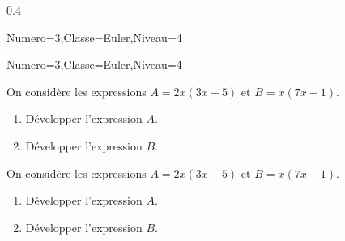 \documentclass[12pt,french]{article}
\newenvironment{Description}
               {\list{}{\labelwidth0pt \leftmargin0pt \itemindent-\leftmargin
                        \let\makelabel\Descriptionlabel}}
               {\endlist}
\newcommand*\Descriptionlabel[1]{\hspace\labelsep
                                \normalfont\bfseries #1}
\begin{document}
\begin{Description}
\begin{Codes}{0.4}{}
\begin{Maquette}[DS]{Numero=3,Classe=Euler,Niveau=4}
\begin{exercice}[BaremeDetaille]
  \end{exercice}
\end{Maquette}
\end{Codes}
\begin{Maquette}[DS]{Numero=3,Classe=Euler,Niveau=4}
  \begin{exercice}  %
    On considère les expressions $A=2x(3x+5)$ et $B=x(7x-1)$.
    \begin{enumerate}
    \item{} Développer l'expression $A$.
    \item{} Développer l'expression $B$.
    \end{enumerate}
  \end{exercice}
  \begin{exercice}[BaremeDetaille]  %
    On considère les expressions $A=2x(3x+5)$ et $B=x(7x-1)$.
    \begin{enumerate}
    \item{} Développer l'expression $A$.
    \item{} Développer l'expression $B$.
    \end{enumerate}
  \end{exercice}
\end{Maquette}
\end{Description}
\clearpage
\end{document}
